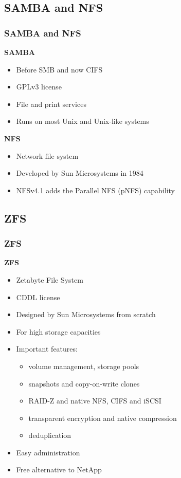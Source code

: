 \documentclass{beamer}
\begin{document}
  \subsection{SAMBA and NFS}
  \begin{frame}
    \frametitle{SAMBA and NFS}
    \textbf{SAMBA}
    \begin{itemize}
      \item Before SMB and now CIFS
      \item GPLv3 license
      \item File and print services
      \item Runs on most Unix and Unix-like systems
    \end{itemize}
    \textbf{NFS}
    \begin{itemize}
      \item Network file system
      \item Developed by Sun Microsystems in 1984
      \item NFSv4.1 adds the Parallel NFS (pNFS) capability
    \end{itemize}
  \end{frame}
  
  
  \subsection{ZFS}
  \begin{frame}
    \frametitle{ZFS}
    \textbf{ZFS}
    \begin{itemize}
      \item Zetabyte File System
      \item CDDL license
      \item Designed by Sun Microsystems from scratch
      \item For high storage capacities
      \item Important features:
        \begin{itemize}
          \item volume management, storage pools
          \item snapshots and copy-on-write clones
          \item RAID-Z and native NFS, CIFS and iSCSI
          \item transparent encryption and native compression
          \item deduplication
        \end{itemize}
      \item Easy administration
      \item Free alternative to NetApp
    \end{itemize}
  \end{frame}
\end{document}
